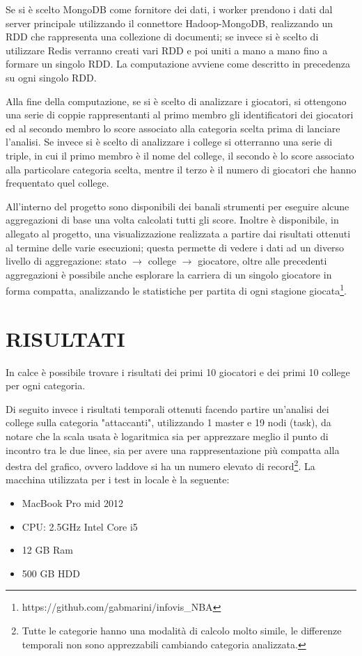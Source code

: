 \documentclass[10pt,a4paper,twocolumn]{article}
\begin{document}
Se si è scelto MongoDB come fornitore dei dati, i worker prendono i dati dal server principale utilizzando il connettore Hadoop-MongoDB, realizzando un RDD che rappresenta una collezione di documenti; se invece si è scelto di utilizzare Redis verranno creati vari RDD e poi uniti a mano a mano fino a formare un singolo RDD. La computazione avviene come descritto in precedenza su ogni singolo RDD.

Alla fine della computazione, se si è scelto di analizzare i giocatori, si ottengono una serie di coppie rappresentanti al primo membro gli identificatori dei giocatori ed al secondo membro lo score associato alla categoria scelta prima di lanciare l'analisi. Se invece si è scelto di analizzare i college si otterranno una serie di triple, in cui il primo membro è il nome del college, il secondo è lo score associato alla particolare categoria scelta, mentre il terzo è il numero di giocatori che hanno frequentato quel college.

All'interno del progetto sono disponibili dei banali strumenti per eseguire alcune aggregazioni di base una volta calcolati tutti gli score. Inoltre è disponibile, in allegato al progetto, una visualizzazione realizzata a partire dai risultati ottenuti al termine delle varie esecuzioni; questa permette di vedere i dati ad un diverso livello di aggregazione: stato $\rightarrow$ college $\rightarrow$ giocatore, oltre alle precedenti aggregazioni è possibile anche esplorare la carriera di un singolo giocatore in forma compatta, analizzando le statistiche per partita di ogni stagione giocata\footnote{https://github.com/gabmarini/infovis\_NBA}.

\section{RISULTATI}

In calce è possibile trovare i risultati dei primi 10 giocatori e dei primi 10 college per ogni categoria.

Di seguito invece i risultati temporali ottenuti facendo partire un'analisi dei college sulla categoria "attaccanti", utilizzando 1 master e 19 nodi (task), da notare che la scala usata è logaritmica sia per apprezzare meglio il punto di incontro tra le due linee, sia per avere una rappresentazione più compatta alla destra del grafico, ovvero laddove si ha un numero elevato di record\footnote{Tutte le categorie hanno una modalità di calcolo molto simile, le differenze temporali non sono apprezzabili cambiando categoria analizzata.}. La macchina utilizzata per i test in locale è la seguente:
\begin{itemize}
	\item MacBook Pro mid 2012
	\item CPU: 2.5GHz Intel Core i5
	\item 12 GB Ram
	\item 500 GB HDD
\end{itemize}
\end{document}
